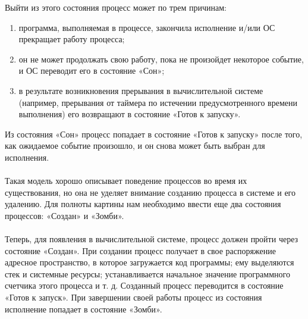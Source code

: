 \documentclass[a4paper]{article}
\begin{document}
Выйти из этого состояния процесс может по трем причинам: 
\begin{enumerate}
  \item программа, выполняемая в процессе, закончила исполнение и/или ОС прекращает работу процесса;
  \item он не может продолжать свою работу, пока не произойдет некоторое событие, и ОС переводит его в состояние «Сон»;
  \item в результате возникновения прерывания в вычислительной системе (например, прерывания от таймера по истечении предусмотренного времени выполнения) его возвращают в состояние «Готов к запуску».
\end{enumerate}
Из состояния «Сон» процесс попадает в состояние «Готов к запуску» после того, как ожидаемое событие произошло, и он снова может быть выбран для исполнения. \\\\
Такая модель хорошо описывает поведение процессов во время их существования, но она не уделяет внимание созданию процесса в системе и его удалению. Для полноты картины нам необходимо ввести еще два состояния процессов: «Создан» и «Зомби». \\\\
Теперь, для появления в вычислительной системе, процесс должен пройти через состояние «Создан». При создании процесс получает в свое распоряжение адресное пространство, в которое загружается код программы; ему выделяются стек и системные ресурсы; устанавливается начальное значение программного счетчика этого процесса и т. д. Созданный процесс переводится в состояние «Готов к запуск». При завершении своей работы процесс из состояния исполнение попадает в состояние «Зомби».
\end{document}
